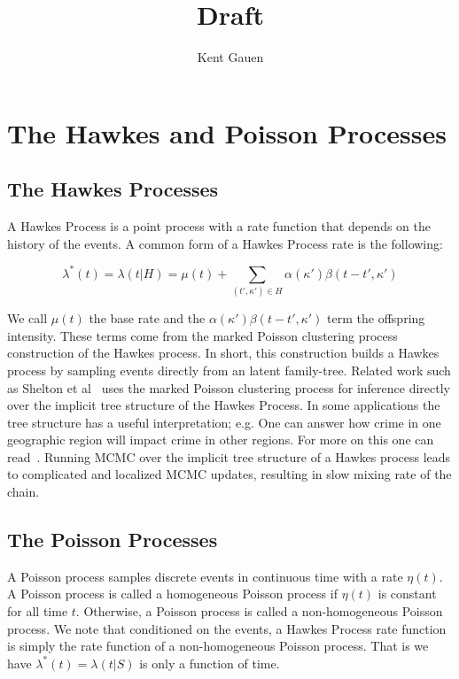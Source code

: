 \documentclass[11pt]{article}
\author{Kent Gauen}
\title{Draft}
\begin{document}
\maketitle

\section{The Hawkes and Poisson Processes}

\subsection{The Hawkes Processes}

\noindent A Hawkes Process is a point process with a rate function that depends on the history of the events. A common form of a Hawkes Process rate is the following:

\[
  \lambda^*(t)
  =
  \lambda(t|H)
  =
  \mu(t)
  +
  \sum_{(t',\kappa')\in H}\alpha(\kappa')\beta(t-t',\kappa')
\]

\noindent We call $\mu(t)$ the base rate and the $\alpha(\kappa')\beta(t-t',\kappa')$ term the offspring intensity. These terms come from the marked Poisson clustering process construction of the Hawkes process. In short, this construction builds a Hawkes process by sampling events directly from an latent family-tree. Related work such as Shelton et al~\cite{AAAI1816985} uses the marked Poisson clustering process for inference directly over the implicit tree structure of the Hawkes Process. In some applications the tree structure has a useful interpretation; e.g. One can answer how crime in one geographic region will impact crime in other regions. For more on this one can read~\cite{Rasmussen2013}. Running MCMC over the implicit tree structure of a Hawkes process leads to complicated and localized MCMC updates, resulting in slow mixing rate of the chain.

\subsection{The Poisson Processes}

\noindent A Poisson process samples discrete events in continuous time with a rate $\eta(t)$. A Poisson process is called a homogeneous Poisson process if $\eta(t)$ is constant for all time $t$. Otherwise, a Poisson process is called a non-homogeneous Poisson process. We note that conditioned on the events, a Hawkes Process rate function is simply the rate function of a non-homogeneous Poisson process. That is we have $\lambda^*(t) = \lambda(t | S)$ is only a function of time.
\end{document}
